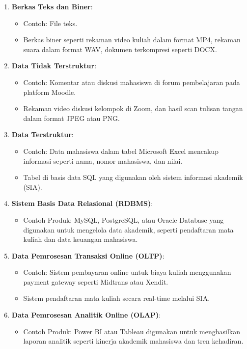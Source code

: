 \begin{enumerate}
	\item \textbf{Berkas Teks dan Biner}: 
	\begin{itemize}
		\item Contoh: File teks.
		\item Berkas biner seperti rekaman video kuliah dalam format MP4, rekaman suara dalam format WAV, dokumen terkompresi seperti DOCX.
	\end{itemize}
	
	\item \textbf{Data Tidak Terstruktur}: 
	\begin{itemize}
		\item Contoh: Komentar atau diskusi mahasiswa di forum pembelajaran pada platform Moodle.
		\item Rekaman video diskusi kelompok di Zoom, dan hasil scan tulisan tangan dalam format JPEG atau PNG.
	\end{itemize}
	
	\item \textbf{Data Terstruktur}: 
	\begin{itemize}
		\item Contoh: Data mahasiswa dalam tabel Microsoft Excel mencakup informasi seperti nama, nomor mahasiswa, dan nilai.
		\item Tabel di basis data SQL yang digunakan oleh sistem informasi akademik (SIA).
	\end{itemize}
	
	\item \textbf{Sistem Basis Data Relasional (RDBMS)}: 
	\begin{itemize}
		\item Contoh Produk: MySQL, PostgreSQL, atau Oracle Database yang digunakan untuk mengelola data akademik, seperti pendaftaran mata kuliah dan data keuangan mahasiswa.
	\end{itemize}
	
	\item \textbf{Data Pemrosesan Transaksi Online (OLTP)}: 
	\begin{itemize}
		\item Contoh: Sistem pembayaran online untuk biaya kuliah menggunakan payment gateway seperti Midtrans atau Xendit.
		\item Sistem pendaftaran mata kuliah secara real-time melalui SIA.
	\end{itemize}
	
	\item \textbf{Data Pemrosesan Analitik Online (OLAP)}: 
	\begin{itemize}
		\item Contoh Produk: Power BI atau Tableau digunakan untuk menghasilkan laporan analitik seperti kinerja akademik mahasiswa dan tren kehadiran.
	\end{itemize}
	

\end{enumerate}
